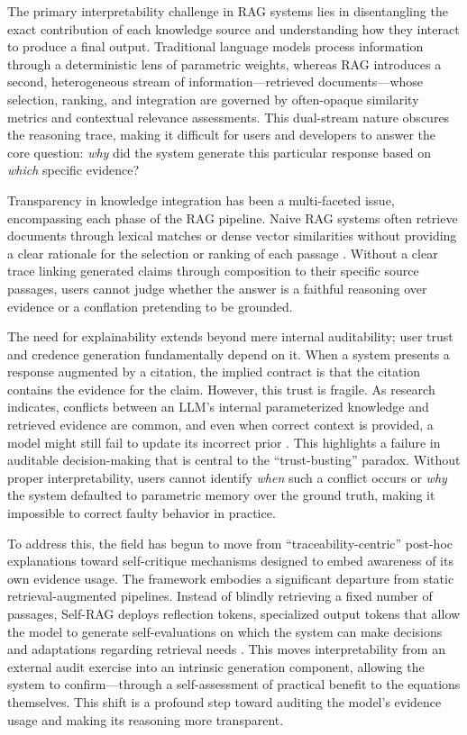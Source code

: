 \documentclass[11pt]{article}
\begin{document}
The primary interpretability challenge in RAG systems lies in disentangling the exact contribution of each knowledge source and understanding how they interact to produce a final output. Traditional language models process information through a deterministic lens of parametric weights, whereas RAG introduces a second, heterogeneous stream of information---retrieved documents---whose selection, ranking, and integration are governed by often-opaque similarity metrics and contextual relevance assessments. This dual-stream nature obscures the reasoning trace, making it difficult for users and developers to answer the core question: \emph{why} did the system generate this particular response based on \emph{which} specific evidence?

Transparency in knowledge integration has been a multi-faceted issue, encompassing each phase of the RAG pipeline. Naive RAG systems often retrieve documents through lexical matches or dense vector similarities without providing a clear rationale for the selection or ranking of each passage \cite{ref1}. Without a clear trace linking generated claims through composition to their specific source passages, users cannot judge whether the answer is a faithful reasoning over evidence or a conflation pretending to be grounded.

The need for explainability extends beyond mere internal auditability; user trust and credence generation fundamentally depend on it. When a system presents a response augmented by a citation, the implied contract is that the citation contains the evidence for the claim. However, this trust is fragile. As research indicates, conflicts between an LLM's internal parameterized knowledge and retrieved evidence are common, and even when correct context is provided, a model might still fail to update its incorrect prior \cite{ref238}. This highlights a failure in auditable decision-making that is central to the ``trust-busting'' paradox. Without proper interpretability, users cannot identify \emph{when} such a conflict occurs or \emph{why} the system defaulted to parametric memory over the ground truth, making it impossible to correct faulty behavior in practice.

To address this, the field has begun to move from ``traceability-centric'' post-hoc explanations toward self-critique mechanisms designed to embed awareness of its own evidence usage. The framework \cite{ref109} embodies a significant departure from static retrieval-augmented pipelines. Instead of blindly retrieving a fixed number of passages, Self-RAG deploys reflection tokens, specialized output tokens that allow the model to generate self-evaluations on which the system can make decisions and adaptations regarding retrieval needs \cite{ref109}. This moves interpretability from an external audit exercise into an intrinsic generation component, allowing the system to confirm---through a self-assessment of practical benefit to the equations themselves. This shift is a profound step toward auditing the model's evidence usage and making its reasoning more transparent.
\end{document}
